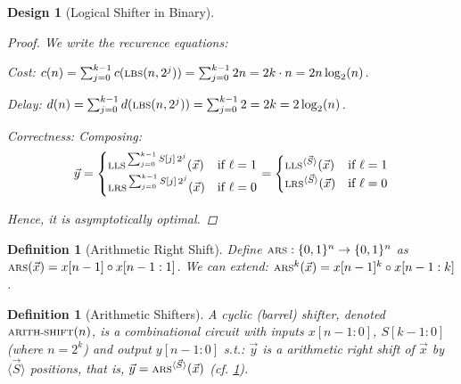 \documentclass[12pt]{article}
\newcommand{\scr}[1]{{\scriptstyle\textup{#1}}}
\newcommand*{\B}{\{0,1\}}
\newcommand{\repr}[1]{\langle{#1}\rangle}
\newtheorem{definition}[theorem]{Definition}
\newtheorem{design}[theorem]{Design}
\begin{document}
\begin{design}[Logical Shifter in Binary]
\begin{proof}
    We write the recurence equations:
    \begin{compactenum}[(i)]
      \item Cost: $c(n)=\sum_{j=0}^{k-1} c(\scr{LBS}(n,2^j))=\sum_{j=0}^{k-1} 2n=2k\cdot n=2n\log_2(n)$.
      \item Delay: $d(n)=\sum_{j=0}^{k-1} d(\scr{LBS}(n,2^j))=\sum_{j=0}^{k-1} 2=2k=2\log_2(n)$.
    \item Correctness: Composing: $$\vec{y}=\begin{cases}\scr{LLS}^{\,\sum_{j=0}^{k-1} S[j]\,2^j}(\vec{x})&\text{if }\ell=1\\\scr{LRS}^{\,\sum_{j=0}^{k-1} S[j]\,2^j}(\vec{x})&\text{if }\ell=0\end{cases}=\begin{cases}\scr{LLS}^{\repr{\vec{S}}}(\vec{x})&\text{if }\ell=1\\\scr{LRS}^{\repr{\vec{S}}}(\vec{x})&\text{if }\ell=0\end{cases}$$
    \end{compactenum}
    Hence, it is asymptotically optimal.
  \end{proof}
\end{design}

\begin{definition}[Arithmetic Right Shift]
  \label{ars}
  Define $\scr{ARS}:\B^n\to\B^n$ as $\scr{ARS}(\vec{x})=x[n-1]\circ x[n-1:1]$. We can extend: $\scr{ARS}^k(\vec{x})=x[n-1]^k\circ x[n-1:k]$.
\end{definition}

\begin{definition}[Arithmetic Shifters]
  A cyclic (barrel) shifter, denoted $\scr{ARITH-SHIFT}(n)$, is a combinational circuit with inputs $x[n-1:0]$, $S[k-1:0]$ (where $n=2^k$) and output $y[n-1:0]$ s.t.: $\vec{y}$ is a arithmetic right shift of $\vec{x}$ by $\repr{\vec{S}}$ positions, that is, $\vec{y}=\scr{ARS}^{\repr{\vec{S}}}(\vec{x})$ (cf. \ref{ars}).
\end{definition}
\end{document}
